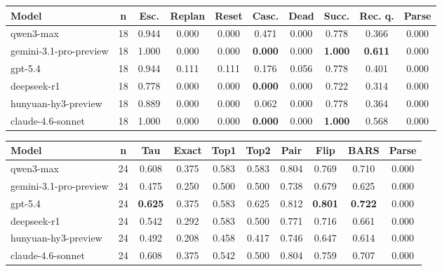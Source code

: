 \begin{center}
\label{tab:appendix_circuit_p3}
\scriptsize
\setlength{\tabcolsep}{3.5pt}
\renewcommand{\arraystretch}{1.08}
\begin{tabular}{lccccccccc}
\toprule
Model & n & Esc. & Replan & Reset & Casc. & Dead & Succ. & Rec. q. & Parse \\
\midrule
qwen3-max & 18 & 0.944 & 0.000 & 0.000 & 0.471 & 0.000 & 0.778 & 0.366 & 0.000 \\
gemini-3.1-pro-preview & 18 & 1.000 & 0.000 & 0.000 & \textbf{0.000} & 0.000 & \textbf{1.000} & \textbf{0.611} & 0.000 \\
gpt-5.4 & 18 & 0.944 & 0.111 & 0.111 & 0.176 & 0.056 & 0.778 & 0.401 & 0.000 \\
deepseek-r1 & 18 & 0.778 & 0.000 & 0.000 & \textbf{0.000} & 0.000 & 0.722 & 0.314 & 0.000 \\
hunyuan-hy3-preview & 18 & 0.889 & 0.000 & 0.000 & 0.062 & 0.000 & 0.778 & 0.364 & 0.000 \\
claude-4.6-sonnet & 18 & 1.000 & 0.000 & 0.000 & \textbf{0.000} & 0.000 & \textbf{1.000} & 0.568 & 0.000 \\
\bottomrule
\end{tabular}
\end{center}

\begin{center}
\label{tab:appendix_circuit_p4}
\scriptsize
\setlength{\tabcolsep}{3.5pt}
\renewcommand{\arraystretch}{1.08}
\begin{tabular}{lccccccccc}
\toprule
Model & n & Tau & Exact & Top1 & Top2 & Pair & Flip & BARS & Parse \\
\midrule
qwen3-max & 24 & 0.608 & 0.375 & 0.583 & 0.583 & 0.804 & 0.769 & 0.710 & 0.000 \\
gemini-3.1-pro-preview & 24 & 0.475 & 0.250 & 0.500 & 0.500 & 0.738 & 0.679 & 0.625 & 0.000 \\
gpt-5.4 & 24 & \textbf{0.625} & 0.375 & 0.583 & 0.625 & 0.812 & \textbf{0.801} & \textbf{0.722} & 0.000 \\
deepseek-r1 & 24 & 0.542 & 0.292 & 0.583 & 0.500 & 0.771 & 0.716 & 0.661 & 0.000 \\
hunyuan-hy3-preview & 24 & 0.492 & 0.208 & 0.458 & 0.417 & 0.746 & 0.647 & 0.614 & 0.000 \\
claude-4.6-sonnet & 24 & 0.608 & 0.375 & 0.542 & 0.500 & 0.804 & 0.759 & 0.707 & 0.000 \\
\bottomrule
\end{tabular}
\end{center}

